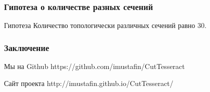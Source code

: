 \documentclass[10pt,pdf,hyperref={unicode}]{beamer}
\begin{document}
\begin{frame}
	\frametitle{Гипотеза о количестве разных сечений}
	\begin{block}{Гипотеза}
		Количество топологически различных сечений равно 30.
	\end{block}
\end{frame}

\begin{frame}
	\frametitle{Заключение}
	\begin{block}{Мы на Github}
		https://github.com/imustafin/CutTesseract
	\end{block}
	\begin{block}{Сайт проекта}
		http://imustafin.github.io/CutTesseract/
	\end{block}
\end{frame}

\begin{frame}
	\vspace{}
\end{frame}
\end{document}
